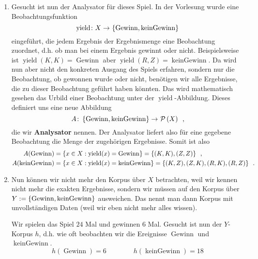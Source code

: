\documentclass[ngerman, a4paper, 12pt]{article}
\newcommand{\begriff}[1]{\textbf{#1}}
\DeclareMathOperator{\yield}{yield}
\DeclareMathOperator{\win}{Gewinn}
\DeclareMathOperator{\nowin}{kein Gewinn}
\newcommand{\satzende}{\enskip \text{.}}
\newcommand{\komma}{\enskip \text{,}}
\begin{document}
\begin{enumerate}[label=\textbf{(\alph*)}, leftmargin=0pt]
	\item
	Gesucht ist nun der Analysator für dieses Spiel. In der Vorlesung wurde eine Beobachtungsfunktion
	\begin{equation*}
		\abb{\yield}{X}{\menge{\win, \nowin}}
	\end{equation*} 
	eingeführt, die jedem Ergebnis der Ergebnismenge eine Beobachtung zuordnet, d.h. ob man bei einem Ergebnis gewinnt oder nicht. Beispielsweise ist $\yield(K,K) = \win$ aber $\yield(R,Z) = \nowin$.
	Da wird nun aber nicht den konkreten Ausgang des Spiels erfahren, sondern nur die Beobachtung, ob gewonnen wurde oder nicht, benötigen wir alle Ergebnisse, die zu dieser Beobachtung geführt haben könnten. Das wird mathematisch gesehen das Urbild einer Beobachtung unter der $\yield$-Abbildung. Dieses definiert uns eine neue Abbildung 
	\begin{equation*}
		\abb{A}{\menge{\win, \nowin}}{\pows{X}} \komma
	\end{equation*} 
	die wir \begriff{Analysator} nennen. Der Analysator liefert also für eine gegebene Beobachtung die Menge der zugehörigen Ergebnisse.
	Somit ist also
	\begin{equation*}
		\begin{aligned}
		A(\win) &= \menge{x \in X: \yield(x) = \win} = \menge{(K,K), (Z,Z)} \komma\\
		A(\nowin) &= \menge{x \in X: \yield(x) = \nowin} = \menge{(K,Z), (Z,K),(R,K),(R,Z)} \satzende
		\end{aligned}
	\end{equation*}
	
	\item
	Nun können wir nicht mehr den Korpus über $X$ betrachten, weil wir kennen nicht mehr die exakten Ergebnisse, sondern wir müssen auf den Korpus über $Y \defeq \menge{\win, \nowin}$ ausweichen. Das nennt man dann Korpus mit unvollständigen Daten (weil wir eben nicht mehr alles wissen).
	
	Wir spielen das Spiel $24$ Mal und gewinnen $6$ Mal. Gesucht ist nun der $Y$-Korpus $h$, d.h. wie oft beobachten wir die Ereignisse $\win$ und $\nowin$.
	\begin{equation*}
		h(\win) = 6 \qquad\qquad h(\nowin) = 18
	\end{equation*}
	
	

\end{enumerate}
\end{document}
